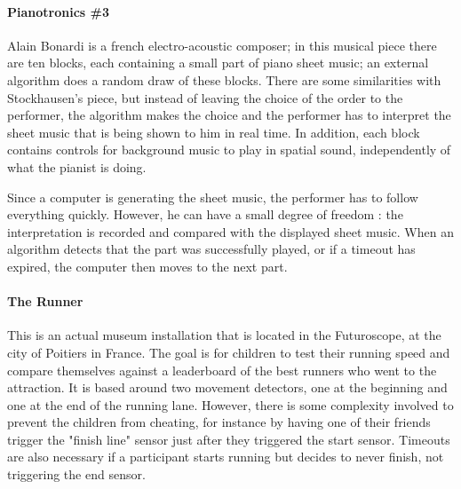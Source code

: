 \documentclass{sigchi}
\begin{document}
\paragraph{Pianotronics \#3}
Alain Bonardi is a french electro-acoustic composer; in this musical piece there are ten blocks, each containing a small part of piano sheet music; an external algorithm does a random draw of these blocks. There are some similarities with Stockhausen's piece, but instead of leaving the choice of the order to the performer, the algorithm makes the choice and the performer has to interpret the sheet music that is being shown to him in real time. In addition, each block contains controls for background music to play in spatial sound, independently of what the pianist is doing.

Since a computer is generating the sheet music, the performer has to follow everything quickly. However, he can have a small degree of freedom : the interpretation is recorded and compared with the displayed sheet music. When an algorithm detects that the part was successfully played, or if a timeout has expired, the computer then moves to the next part.

\paragraph{The Runner}
This is an actual museum installation that is located in the Futuroscope, at the city of Poitiers in France. The goal is for children to test their running speed and compare themselves against a leaderboard of the best runners who went to the attraction. It is based around two movement detectors, one at the beginning and one at the end of the running lane. However, there is some complexity involved to prevent the children from cheating, for instance by having one of their friends trigger the "finish line" sensor just after they triggered the start sensor. Timeouts are also necessary if a participant starts running but decides to never finish, not triggering the end sensor.
\end{document}
